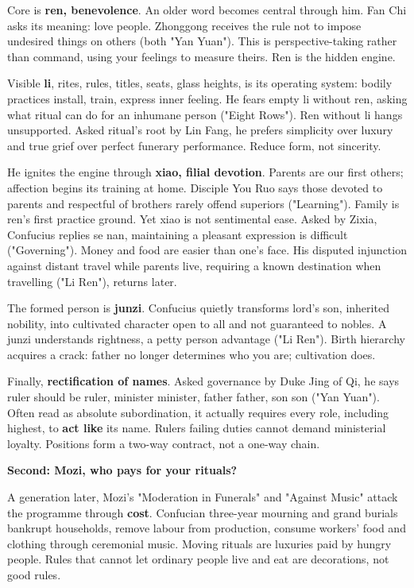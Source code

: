 Core is \textbf{ren, benevolence}. An older word becomes central through him. Fan Chi asks its meaning: love people. Zhonggong receives the rule not to impose undesired things on others (both "Yan Yuan"). This is perspective-taking rather than command, using your feelings to measure theirs. Ren is the hidden engine.

Visible \textbf{li}, rites, rules, titles, seats, glass heights, is its operating system: bodily practices install, train, express inner feeling. He fears empty li without ren, asking what ritual can do for an inhumane person ("Eight Rows"). Ren without li hangs unsupported. Asked ritual's root by Lin Fang, he prefers simplicity over luxury and true grief over perfect funerary performance. Reduce form, not sincerity.

He ignites the engine through \textbf{xiao, filial devotion}. Parents are our first others; affection begins its training at home. Disciple You Ruo says those devoted to parents and respectful of brothers rarely offend superiors ("Learning"). Family is ren's first practice ground. Yet xiao is not sentimental ease. Asked by Zixia, Confucius replies se nan, maintaining a pleasant expression is difficult ("Governing"). Money and food are easier than one's face. His disputed injunction against distant travel while parents live, requiring a known destination when travelling ("Li Ren"), returns later.

The formed person is \textbf{junzi}. Confucius quietly transforms lord's son, inherited nobility, into cultivated character open to all and not guaranteed to nobles. A junzi understands rightness, a petty person advantage ("Li Ren"). Birth hierarchy acquires a crack: father no longer determines who you are; cultivation does.

Finally, \textbf{rectification of names}. Asked governance by Duke Jing of Qi, he says ruler should be ruler, minister minister, father father, son son ("Yan Yuan"). Often read as absolute subordination, it actually requires every role, including highest, to \textbf{act like} its name. Rulers failing duties cannot demand ministerial loyalty. Positions form a two-way contract, not a one-way chain.

\textbf{Second: Mozi, who pays for your rituals?}

A generation later, Mozi's "Moderation in Funerals" and "Against Music" attack the programme through \textbf{cost}. Confucian three-year mourning and grand burials bankrupt households, remove labour from production, consume workers' food and clothing through ceremonial music. Moving rituals are luxuries paid by hungry people. Rules that cannot let ordinary people live and eat are decorations, not good rules.

